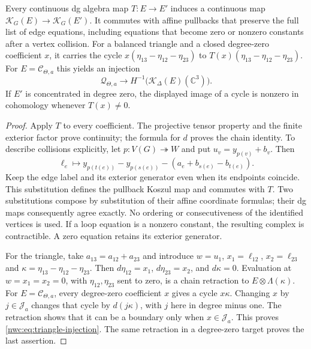 \begin{proposition}\label{nwc:prop:supported-coefficients}
Every continuous dg algebra map $T:E\to E'$ induces a continuous
map $\mathcal K_G(E)\to\mathcal K_G(E')$.
It commutes with affine pullbacks that preserve the full list of
edge equations, including equations that become zero or nonzero
constants after a vertex collision.
For a balanced triangle and a closed degree-zero coefficient $x$, it carries the cycle
$x(\eta_{13}-\eta_{12}-\eta_{23})$ to
$T(x)(\eta_{13}-\eta_{12}-\eta_{23})$.
For $E=\mathcal C_{\Theta,a}$ this yields an injection
\begin{equation}\label{nwc:eq:triangle-injection}
 \mathcal Q_{\Theta,a}\longrightarrow
 H^{-1}\bigl(\mathcal K_\Delta(E)(\mathbb C^3)\bigr).
\end{equation}
If $E'$ is concentrated in degree zero, the displayed image of a
cycle is nonzero in cohomology whenever $T(x)\ne0$.
\end{proposition}
\begin{proof}
Apply $T$ to every coefficient. The projective tensor property and
the finite exterior factor prove continuity; the formula for $d$
proves the chain identity.
To describe collisions explicitly, let $p:V(G)\twoheadrightarrow W$
and put $u_v=y_{p(v)}+b_v$.
Then
\[
 \ell_e\longmapsto
 y_{p(t(e))}-y_{p(s(e))}
       -(a_e+b_{s(e)}-b_{t(e)}).
\]
Keep the edge label and its exterior generator even when its endpoints
coincide. This substitution defines the pullback Koszul map and
commutes with $T$. Two substitutions compose by substitution of their
affine coordinate formulas; their dg maps consequently agree exactly.
No ordering or consecutiveness of the identified vertices is used.
If a loop equation is a nonzero constant, the resulting complex is
contractible. A zero equation retains its exterior generator.

For the triangle, take $a_{13}=a_{12}+a_{23}$ and introduce
$w=u_1$, $x_1=\ell_{12}$, $x_2=\ell_{23}$ and
$\kappa=\eta_{13}-\eta_{12}-\eta_{23}$.
Then $d\eta_{12}=x_1$, $d\eta_{23}=x_2$, and $d\kappa=0$.
Evaluation at $w=x_1=x_2=0$, with
$\eta_{12},\eta_{23}$ sent to zero, is a chain retraction to
$E\otimes\Lambda(\kappa)$.
For $E=\mathcal C_{\Theta,a}$, every degree-zero coefficient $x$
gives a cycle $x\kappa$.
Changing $x$ by $j\in\mathcal J_a$ changes that cycle by
$d(j\kappa)$, with $j$ here in degree minus one.
The retraction shows that it can be a boundary only when
$x\in\mathcal J_a$. This proves \eqref{nwc:eq:triangle-injection}.
The same retraction in a degree-zero target proves the last assertion.
\end{proof}

